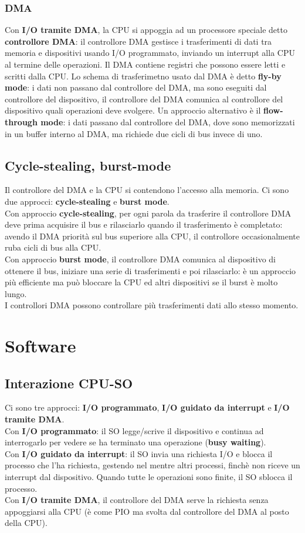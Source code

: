 \documentclass[12pt]{article}
\begin{document}
\subsubsection{DMA}
Con \textbf{I/O tramite DMA}, la CPU si appoggia ad un processore speciale detto \textbf{controllore DMA}: il controllore 
DMA gestisce i trasferimenti di dati tra memoria e dispositivi usando I/O programmato, inviando un interrupt alla CPU al 
termine delle operazioni. Il DMA contiene registri che possono essere letti e scritti dalla CPU. Lo schema di trasferimetno 
usato dal DMA è detto \textbf{fly-by mode}: i dati non passano dal controllore del DMA, ma sono eseguiti dal controllore 
del dispositivo, il controllore del DMA comunica al controllore del dispositivo quali operazioni deve svolgere. Un approccio 
alternativo è il \textbf{flow-through mode}: i dati passano dal controllore del DMA, dove sono memorizzati in un buffer 
interno al DMA, ma richiede due cicli di bus invece di uno.
\subsection{Cycle-stealing, burst-mode}
Il controllore del DMA e la CPU si contendono l'accesso alla memoria. Ci sono due approcci: \textbf{cycle-stealing} e 
\textbf{burst mode}.\\
Con approccio \textbf{cycle-stealing}, per ogni parola da trasferire il controllore DMA deve prima acquisire il bus e rilasciarlo 
quando il trasferimento è completato: avendo il DMA priorità sul bus superiore alla CPU, il controllore occasionalmente 
ruba cicli di bus alla CPU.\\
Con approccio \textbf{burst mode}, il controllore DMA comunica al dispositivo di ottenere il bus, iniziare una serie di 
trasferimenti e poi rilasciarlo: è un approccio più efficiente ma può bloccare la CPU ed altri dispositivi se il burst è 
molto lungo.\\
I controllori DMA possono controllare più trasferimenti dati allo stesso momento.
\section{Software}
\subsection{Interazione CPU-SO}
Ci sono tre approcci: \textbf{I/O programmato}, \textbf{I/O guidato da interrupt} e \textbf{I/O tramite DMA}.\\
Con \textbf{I/O programmato}: il SO legge/scrive il dispositivo e continua ad interrogarlo per vedere se ha terminato una 
operazione (\textbf{busy waiting}).\\
Con \textbf{I/O guidato da interrupt}: il SO invia una richiesta I/O e blocca il processo che l'ha richiesta, gestendo 
nel mentre altri processi, finchè non riceve un interrupt dal dispositivo. Quando tutte le operazioni sono finite, il SO 
sblocca il processo.\\
Con \textbf{I/O tramite DMA}, il controllore del DMA serve la richiesta senza appoggiarsi alla CPU (è come PIO ma svolta 
dal controllore del DMA al posto della CPU).
\end{document}
